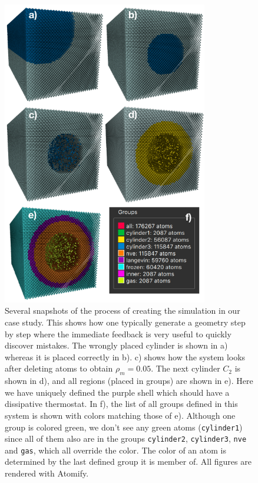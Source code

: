 \documentclass[12pt,a4paper,final]{iopart}
\newcommand{\code}[1]{\colorbox{light-gray}{\color{RawSienna}\texttt{#1}}}
\begin{document}
\begin{figure}
	\centering
	\includegraphics[width=0.8\textwidth]{figures/initial_configuration.pdf}
	\caption{
		Several snapshots of the process of creating the simulation in our case study.
		This shows how one typically generate a geometry step by step where the immediate
		feedback is very useful to quickly discover mistakes.
		The wrongly placed cylinder is shown in a) whereas it is placed correctly in b).
		c) shows how the system looks after deleting atoms to obtain $\rho_m = 0.05$. The next cylinder $C_2$ is shown in d),
		and all regions (placed in groups) are shown in e). Here we have uniquely defined the purple shell which should have a dissipative thermostat.
		In f), the list of all groups defined in this system is shown with colors matching those of e).
		Although one group is colored green, we don't see any green atoms (\code{cylinder1})
		since all of them also are in the groups \code{cylinder2}, \code{cylinder3}, \code{nve} and \code{gas},
		which all override the color. The color of an atom is determined by the last defined group it is member of.
		All figures are rendered with Atomify.
    }
	\label{fig:initial_configuration}
\end{figure}
\end{document}
